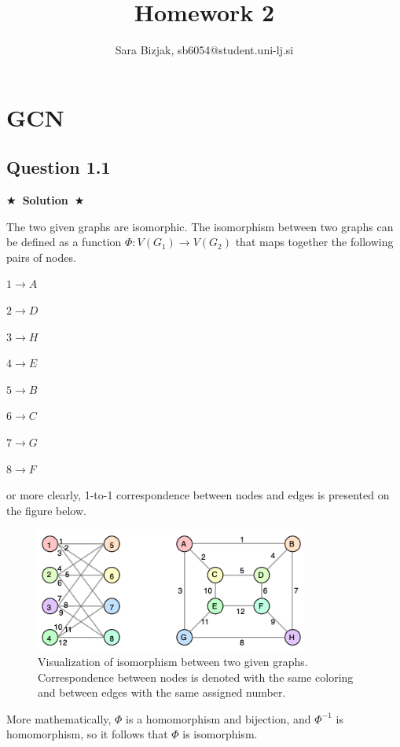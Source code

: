 \documentclass{article}
\title{Homework 2}
\author{Sara Bizjak, sb6054@student.uni-lj.si}
\newcommand{\Solution}[1]{{\medskip \color{black} \bf $\bigstar$~\sf \textbf{Solution}~$\bigstar$ \sf #1 } \bigskip}
\begin{document}
\maketitle


\section{GCN}
\subsection*{Question 1.1}
\Solution{

\noindent
  The two given graphs are isomorphic. The isomorphism between two graphs can be defined as a function $\Phi: V(G_1) \to V(G_2)$ that maps together the following pairs of nodes.
  \begin{itemize}
    \begin{minipage}{0.5\textwidth}
    \item $1 \to A$
    \item $2 \to D$
    \item $3 \to H$
    \item $4 \to E$
    \end{minipage}
    \begin{minipage}{0.5\textwidth}
    \item $5 \to B$
    \item $6 \to C$
    \item $7 \to G$
    \item $8 \to F$
    \end{minipage}
  \end{itemize}
  or more clearly, 1-to-1 correspondence between nodes and edges is presented on the figure below.

  \begin{figure}[ht!]
    \centering
    \includegraphics[width=90mm]{Slike/1_1.png}
    \caption{Visualization of isomorphism between two given graphs. Correspondence between nodes is denoted with the same coloring and between edges with the same assigned number.}
  \end{figure}
  \noindent
  More mathematically, $\Phi$ is a homomorphism and bijection, and $\Phi^{-1}$ is homomorphism, so it follows that $\Phi$ is isomorphism.
}
\end{document}
